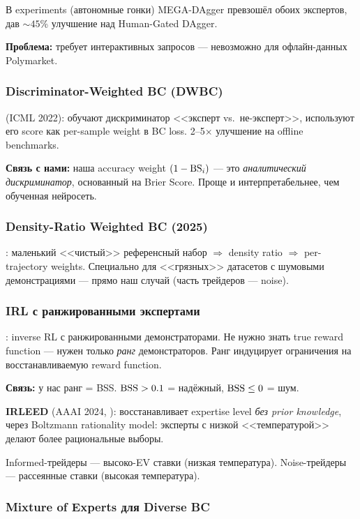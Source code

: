 В experiments (автономные гонки) MEGA-DAgger превзошёл обоих экспертов,
дав ${\sim}45$\% улучшение над Human-Gated DAgger.

\textbf{Проблема:} требует интерактивных запросов --- невозможно для офлайн-данных Polymarket.

\subsubsection{Discriminator-Weighted BC (DWBC)}

\citet{xu2022dwbc} (ICML 2022): обучают дискриминатор <<эксперт vs.\ не-эксперт>>,
используют его score как per-sample weight в BC loss.
2--5$\times$ улучшение на offline benchmarks.

\textbf{Связь с нами:} наша accuracy weight $(1 - \mathrm{BS}_i)$ ---
это \emph{аналитический дискриминатор}, основанный на Brier Score.
Проще и интерпретабельнее, чем обученная нейросеть.

\subsubsection{Density-Ratio Weighted BC (2025)}

\citet{densityratio2025}: маленький <<чистый>> референсный набор
$\Rightarrow$ density ratio $\Rightarrow$ per-trajectory weights.
Специально для <<грязных>> датасетов с шумовыми демонстрациями ---
прямо наш случай (часть трейдеров --- noise).

\subsubsection{IRL с ранжированными экспертами}

\citet{brown2019irl}: inverse RL с ранжированными демонстраторами.
Не нужно знать true reward function --- нужен только \emph{ранг} демонстраторов.
Ранг индуцирует ограничения на восстанавливаемую reward function.

\textbf{Связь:} у нас ранг = BSS.
$\mathrm{BSS} > 0.1$ = надёжный, $\mathrm{BSS} \leq 0$ = шум.

\textbf{IRLEED} (AAAI 2024, \citealt{irleed2024}):
восстанавливает expertise level \emph{без prior knowledge},
через Boltzmann rationality model: эксперты с низкой <<температурой>> делают
более рациональные выборы.

Informed-трейдеры --- высоко-EV ставки (низкая температура).
Noise-трейдеры --- рассеянные ставки (высокая температура).

\subsubsection{Mixture of Experts для Diverse BC}

